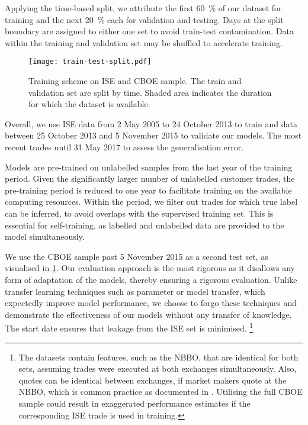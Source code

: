 Applying the time-based split, we attribute the first \SI{60}{\percent} of our dataset for training and the next \SI{20}{\percent} each for validation and testing. Days at the split boundary are assigned to either one set to avoid train-test contamination. Data within the training and validation set may be shuffled to accelerate training.

\begin{figure}[ht]
    \centering
    \texttt{[image: train-test-split.pdf]}
    \caption[Training Scheme on  and  Sample]{Training scheme on \gls{ISE} and \gls{CBOE} sample. The train and validation set are split by time. Shaded area  indicates the duration for which the dataset is available.}
    \label{fig:train-test-split}
\end{figure}

Overall, we use \gls{ISE} data from 2 May 2005 to 24 October 2013 to train and data between 25 October 2013 and 5 November 2015 to validate our models. The most recent trades until 31 May 2017 to assess the generalisation error.

Models are pre-trained on unlabelled samples from the last year of the training period. Given the significantly larger number of unlabelled customer trades, the pre-training period is reduced to one year to facilitate training on the available computing resources. Within the period, we filter out trades for which true label can be inferred, to avoid overlaps with the supervised training set. This is essential for self-training, as labelled and unlabelled data are provided to the model simultaneously.

We use the \gls{CBOE} sample past 5 November 2015 as a second test set, as visualised in \cref{fig:train-test-split}. Our evaluation approach is the most rigorous as it disallows any form of adaptation of the models, thereby ensuring a rigorous evaluation. Unlike transfer learning techniques such as parameter or model transfer, which expectedly improve model performance, we choose to forgo these techniques and demonstrate the effectiveness of our models without any transfer of knowledge. The start date ensures that leakage from the \gls{ISE} set is minimised. \footnote{The datasets contain features, such as the \gls{NBBO}, that are identical for both sets, assuming trades were executed at both exchanges simultaneously. Also, quotes can be identical between exchanges, if market makers quote at the \gls{NBBO}, which is common practice as documented in \textcite[10]{securitiesandexchangecommissionReportConcerningExaminations2007}. Utilising the full \gls{CBOE} sample could result in exaggerated performance estimates if the corresponding \gls{ISE} trade is used in training.}

